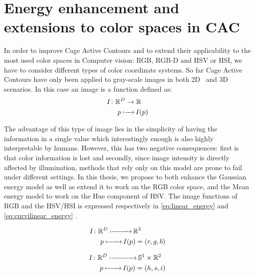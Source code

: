 \newpage
\chapter{Energy enhancement and extensions to color spaces in CAC}
\label{sec:proposed_methods}
\noindent

In order to improve Cage Active Contours and to extend their applicability to the most used color spaces in Computer vision: RGB, RGB-D and HSV or HSI, we have to consider different types of color coordinate systems. So far Cage Active Contours have only been applied to gray-scale images in both 2D~\cite{ipcac2015} and 3D~\cite{visapp2014} scenarios. In this case an image is a function defined as:
\begin{equation} \label{eq1:grayscale_image}
\begin{split}
I \colon & \mathbb{R}^{D} \to \mathbb{R} \\
& \phantomarrow{AA}{p} I(p) 
\end{split}
\end{equation}

The advantage of this type of image lies in the simplicity of having the information in a single value which interestingly enough is also highly interpretable by humans. However, this has two negative consequences: first is that color information is lost and secondly, since image intensity is directly affected by illumination, methods that rely only on this model are prone to fail under different settings. In this thesis, we propose to both enhance the Gaussian energy model as well as extend it to work on the RGB color space, and the Mean energy model to work on the Hue component of HSV. The image functions of RGB and the HSV/HSI is expressed respectively in \eqref{eq:linear_energy} and \eqref{eq:curvilinear_energy} .

\begin{equation} \label{eq:linear_energy}
\begin{split}
I \colon & \mathbb{R}^{D} \phantomarrow{AAA} {}  \mathbb{R}^3 \\
& \phantomarrow{AAA}{p} I(p)=(r,g,b)
\end{split}
\end{equation}

\begin{equation} \label{eq:curvilinear_energy}
\begin{split}
I \colon & \mathbb{R}^{D} \phantomarrow{AAAA} {}\mathbb{S}^1\times\mathbb{R}^2\\
& \phantomarrow{AAA}{p} I(p) =(h,s,i)
\end{split}
\end{equation}


